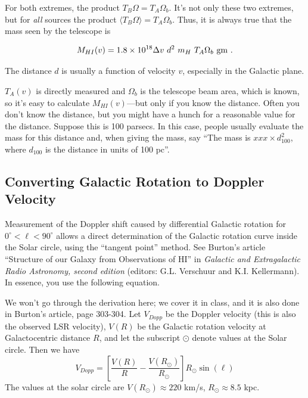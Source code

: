 \documentclass[psfig,preprint]{aastex}
\begin{document}
For both extremes, the product $T_B \Omega = T_A \Omega_b$. 
It's not only these two extremes, but for {\it all} sources the
product $\langle T_B \Omega \rangle= T_A \Omega_b$.  Thus, it is always true that the
mass seen by the telescope is

\begin{equation}  \label{telemass1}
M_{HI}(v) = 1.8 \times 10^{18} \Delta v \ d^2 \ m_H \ T_A  \Omega_b  \ {\rm
gm} \ . 
\end{equation}

\noindent The distance $d$ is usually a function of velocity $v$,
especially in the Galactic plane. 

	$T_A(v)$ is directly measured and $\Omega_b$ is the telescope
beam area, which is known, so it's easy to calculate $M_{HI}(v)$---but
only if you know the distance. Often you don't know the distance, but
you might have a hunch for a reasonable value for the distance. Suppose
this is 100 parsecs. In this case, people usually evaluate the mass for
this distance and, when giving the mass, say ``The mass is $xxx \times
d_{100}^2$, where $d_{100}$ is the distance in units of 100 pc''.

\subsection{Converting Galactic Rotation to Doppler Velocity}

\noindent
          Measurement of the Doppler shift caused by differential
Galactic rotation for $0^\circ < \ell < 90^\circ$ allows a direct
determination of the Galactic rotation curve inside the Solar circle,
using the ``tangent point'' method. See Burton's article ``Structure
of our Galaxy from Observations of HI'' in {\it Galactic and
Extragalactic Radio Astronomy, second edition} (editors: G.L. Verschuur
and K.I. Kellermann). In essence, you use the following equation.

	We won't go through the derivation here; we cover it in class,
and it is also done in Burton's article,
page 303-304.  Let $V_{Dopp}$ be the Doppler velocity (this is also the
observed LSR velocity), $V(R)$ be the Galactic rotation velocity at
Galactocentric distance $R$, and let the subscript $\odot$ denote values
at the Solar circle.  Then we have
\begin{equation} \label{vdopp}
V_{Dopp} = \left[ \frac{V(R)}{R} - \frac{V(R_\odot)}{R_\odot}\right]
R_\odot \sin(\ell)
\end{equation}
\noindent The values at the solar circle are $V(R_\odot) \approx 220$
km/s, $R_\odot \approx 8.5$ kpc.
\end{document}
